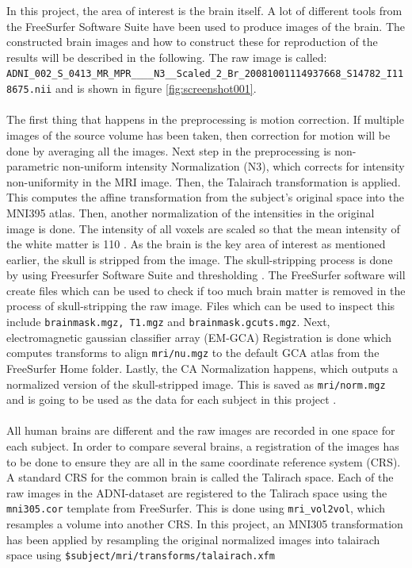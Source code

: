 \documentclass[11pt, fleqn, titlepage]{article}
\newcommand{\1}[1]{\mathds{1}\left[#1\right]}
\begin{document}
In this project, the area of interest is the brain itself. A lot of different tools from the FreeSurfer Software Suite have been used to produce images of the brain. The constructed brain images and how to construct these for reproduction of the results will be described in the following. The raw image is called: \newline \texttt{
ADNI\_002\_S\_0413\_MR\_MPR\_\_\_\_N3\_\_Scaled\_2\_Br\_20081001114937668\_S14782\_I118675.nii} and is shown in figure \ref{fig:screenshot001}. 
\\\\
The first thing that happens in the preprocessing is motion correction. If multiple images of the source volume has been taken, then correction for motion will be done by averaging all the images.
Next step in the preprocessing is non-parametric non-uniform intensity Normalization (N3), which corrects for intensity non-uniformity in the MRI image.
Then, the Talairach transformation is applied. This computes the affine transformation from the subject's original space into the MNI395 atlas.
Then, another normalization of the intensities in the original image is done. The intensity of all voxels are scaled so that the mean intensity of the white matter is 110 \cite{normalize}. 
As the brain is the key area of interest as mentioned earlier, the skull is stripped from the image. The skull-stripping process is done by using Freesurfer Software Suite and thresholding \cite{freesurfer}.
The FreeSurfer software will create files which can be used to check if too much brain matter is removed in the process of skull-stripping the raw image.
Files which can be used to inspect this include \texttt{brainmask.mgz, T1.mgz} and \texttt{brainmask.gcuts.mgz}.
Next, electromagnetic gaussian classifier array (EM-GCA) Registration is done which computes transforms to align
\texttt{mri/nu.mgz} to the default GCA atlas from the FreeSurfer Home folder. Lastly, the CA Normalization happens, which outputs a normalized version of the skull-stripped image. This is saved as \texttt{mri/norm.mgz} and is going to be used as the data for each subject in this project \cite{reckon}.
\\\\
All human brains are different and the raw images are recorded in one space for each subject.
In order to compare several brains, a registration of the images has to be done to ensure they are all in the same coordinate reference system (CRS). 
A standard CRS for the common brain is called the Talirach space. 
Each of the raw images in the ADNI-dataset are registered to the Talirach space using the \texttt{mni305.cor} template from FreeSurfer. 
This is done using \texttt{mri\_vol2vol}, which resamples a volume into another CRS. 
In this project, an MNI305 transformation has been applied by resampling the original normalized images into talairach space using \texttt{\$subject/mri/transforms/talairach.xfm} 
\end{document}
